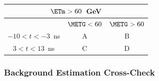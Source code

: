 \documentclass{beamer}
\begin{document}
\begin{frame}     
  \begin{minipage}[b]{0.8\paperwidth}
   \begin{tcolorbox}[colback=UNL@Cream!5,colframe=UMN@Maroon!40,title=\textcolor{UMN@Maroon}{\textbf{Closure Test: $< 2$-Jets Events}}] 
        \begin{tabular}{|c || c|| c|}
       \multicolumn{3}{c}{\bfseries{$\ETm > 60$~GeV}} \\
       \hline \hline
          & $\METG < 60$ & $\METG > 60$ \\       
          \hline \hline \hline
          $-10 < t < -3$~ns & A &  B \\
          \hline \hline \hline  
         $3 < t < 13$~ns & C &  D \\
        \hline \hline
        \end{tabular}
   \end{tcolorbox} 
 \end{minipage}
 \end{frame}



\begin{frame}
\frametitle{Background Estimation Cross-Check}
 \begin{minipage}[t]{0.8\linewidth}
  \begin{tcolorbox}[colback=UNL@Cream!5,colframe=UMN@Maroon!40,title=\textcolor{UMN@Maroon}{\textbf{ Control Sample $Z\rightarrow ee$ Events}}]
 
 
   \end{tcolorbox}
  \end{minipage}
\end{frame}
\end{document}
